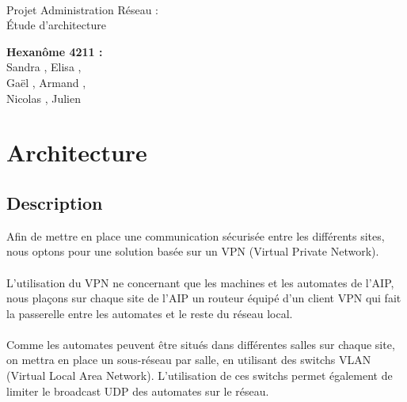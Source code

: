 \documentclass[a4paper]{article}
\begin{document}
\begin{titlepage}
	~ 
	\vfill
	\begin{center}
		\begin{Huge}
			Projet Administration Réseau : \\ Étude d'architecture\\
		\end{Huge}
	\vfill
		\textbf{Hexanôme 4211 :} 
			\\Sandra {}, Elisa , 
			\\Gaël , Armand , 
			\\Nicolas {}, Julien \\
	\vfill
	\end{center}
	\vfill
\end{titlepage}

\newpage
\tableofcontents
\newpage

\section{Architecture}

	\subsection{Description} %
	
	Afin de mettre en place une communication sécurisée entre les différents sites, nous optons pour une solution basée sur un VPN (Virtual Private Network). 
	
	\paragraph*{} %
	L'utilisation du VPN ne concernant que les machines et les automates de l'AIP, nous plaçons sur chaque site de l'AIP un routeur équipé d'un client VPN qui fait la passerelle entre les automates et le reste du réseau local. 
	
	\paragraph*{} %
	Comme les automates peuvent être situés dans différentes salles sur chaque site, on mettra en place un sous-réseau par salle, en utilisant des switchs VLAN (Virtual Local Area Network). L'utilisation de ces switchs permet également de limiter le broadcast UDP des automates sur le réseau. 
	
\end{document}
